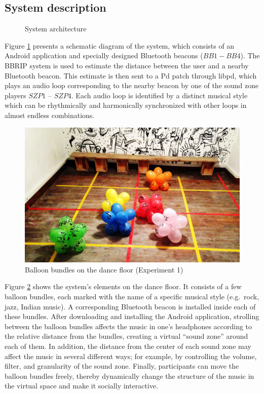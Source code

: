\documentclass[a4paper,11pt]{article}
\begin{document}
\subsection{System description}\label{systemdescription}

\begin{figure}[!htb]
	\centering
	\def\svgwidth{0.9\textwidth}
	
	\caption{System architecture}\label{fig:sys:architecture}
\end{figure}

Figure \ref{fig:sys:architecture} presents a schematic diagram of the system, which consists of an Android application and specially designed Bluetooth beacons ($BB1 - BB4$).
The BBRIP system is used to estimate the distance between the user and a nearby Bluetooth beacon.
This estimate is then sent to a Pd patch through libpd, which plays an audio loop corresponding to the nearby beacon by one of the sound zone players $SZP1$ -- $SZP4$.
Each audio loop is identified by a distinct musical style which can be rhythmically and harmonically synchronized with other loops in almost endless combinations.

\begin{figure}[!htb]
	\includegraphics[width=\linewidth]{balloons}
        \caption{Balloon bundles on the dance floor (Experiment 1)}\label{fig:balloons}
\end{figure}

Figure \ref{fig:balloons} shows the system's elements on the dance floor.
It consists of a few balloon bundles, each marked with the name of a specific musical style (e.g.\ rock, jazz, Indian music).
A corresponding Bluetooth beacon is installed inside each of these bundles.
After downloading and installing the Android application, strolling between the balloon bundles affects the music in one's headphones according to the relative distance from the bundles, creating a virtual ``sound zone'' around each of them.
In addition, the distance from the center of each sound zone may affect the music in several different ways; for example, by controlling the volume, filter, and granularity of the sound zone.
Finally, participants can move the balloon bundles freely, thereby dynamically change the structure of the music in the virtual space and make it socially interactive.
\end{document}
